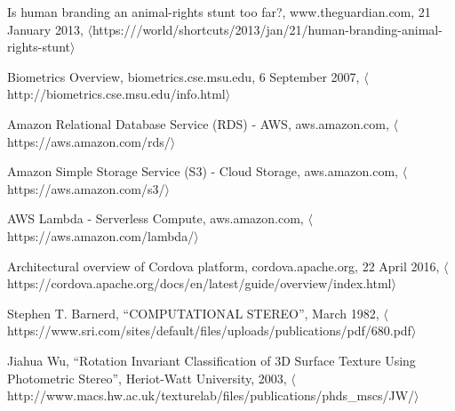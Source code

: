 \begin{thebibliography}{1}

  Is human branding an animal-rights stunt too far?,
  www.theguardian.com,
  21 January 2013,
  $\langle$https:///world/shortcuts/2013/jan/21/human-branding-animal-rights-stunt$\rangle$

  Biometrics Overview,
  biometrics.cse.msu.edu,
  6 September 2007,
  $\langle$http://biometrics.cse.msu.edu/info.html$\rangle$

  Amazon Relational Database Service (RDS) - AWS,
  aws.amazon.com,
  $\langle$https://aws.amazon.com/rds/$\rangle$

  Amazon Simple Storage Service (S3) - Cloud Storage,
  aws.amazon.com,
  $\langle$https://aws.amazon.com/s3/$\rangle$

  AWS Lambda - Serverless Compute,
  aws.amazon.com,
  $\langle$https://aws.amazon.com/lambda/$\rangle$
  
  Architectural overview of Cordova platform,
  cordova.apache.org,
  22 April 2016,
  $\langle$https://cordova.apache.org/docs/en/latest/guide/overview/index.html$\rangle$

  Stephen T. Barnerd,
  ``COMPUTATIONAL STEREO'',
  March 1982,
  $\langle$https://www.sri.com/sites/default/files/uploads/publications/pdf/680.pdf$\rangle$

  Jiahua Wu,
  ``Rotation Invariant Classification of 3D Surface Texture Using Photometric Stereo'',
  Heriot-Watt University,
  2003,
  $\langle$http://www.macs.hw.ac.uk/texturelab/files/publications/phds\_mscs/JW/$\rangle$


\end{thebibliography}
